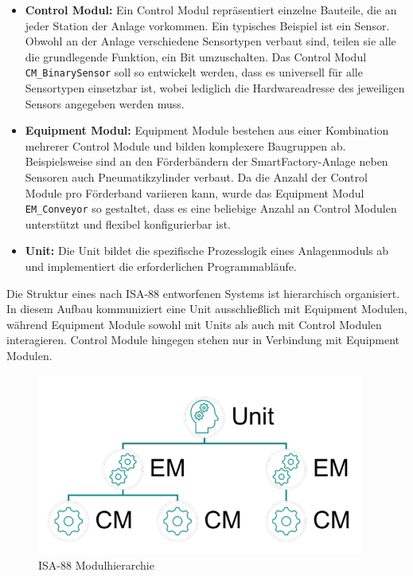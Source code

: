 \sloppy
\begin{itemize}
    \item \textbf{Control Modul:} Ein Control Modul repräsentiert einzelne Bauteile, die an jeder Station der Anlage
    vorkommen. Ein typisches Beispiel ist ein Sensor. Obwohl an der Anlage verschiedene Sensortypen verbaut sind, teilen 
    sie alle die grundlegende Funktion, ein Bit umzuschalten. Das Control Modul \texttt{CM\_BinarySensor} soll so entwickelt 
    werden, dass es universell für alle Sensortypen einsetzbar ist, wobei lediglich die Hardwareadresse des jeweiligen 
    Sensors angegeben werden muss.

    \item \textbf{Equipment Modul:} Equipment Module bestehen aus einer Kombination mehrerer Control Module und bilden 
    komplexere Baugruppen ab. Beispielsweise sind an den Förderbändern der SmartFactory-Anlage neben Sensoren auch 
    Pneumatikzylinder verbaut. Da die Anzahl der Control Module pro Förderband variieren kann, wurde das Equipment Modul 
    \texttt{EM\_Conveyor} so gestaltet, dass es eine beliebige Anzahl an Control Modulen unterstützt und flexibel 
    konfigurierbar ist.

    \item \textbf{Unit:} Die Unit bildet die spezifische Prozesslogik eines Anlagenmoduls ab und implementiert die 
    erforderlichen Programmabläufe.
\end{itemize}

Die Struktur eines nach ISA-88 entworfenen Systems ist hierarchisch organisiert. In diesem Aufbau kommuniziert eine Unit 
ausschließlich mit Equipment Modulen, während Equipment Module sowohl mit Units als auch mit Control Modulen interagieren. 
Control Module hingegen stehen nur in Verbindung mit Equipment Modulen.

\begin{figure}[h!]
    \centering
    \includegraphics*{figures/Screenshot 2025-01-03 201917.png}
    \caption{ISA-88 Modulhierarchie\cite{bee2022}} %
    \label{fig:isa88-modulhierarchie} %
\end{figure}

